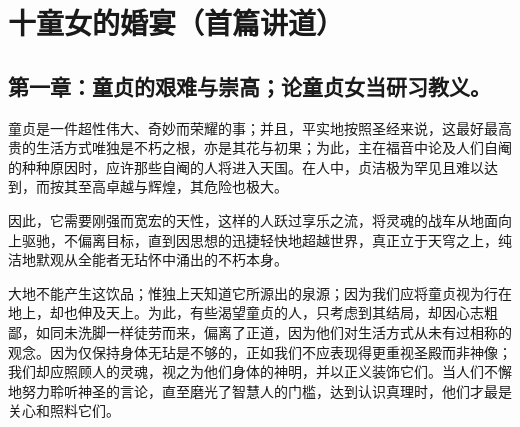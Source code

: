 

\section{十童女的婚宴（首篇讲道）}

\par


\subsection{第一章：童贞的艰难与崇高；论童贞女当研习教义。}

童贞是一件超性伟大、奇妙而荣耀的事；并且，平实地按照圣经来说，这最好最高贵的生活方式唯独是不朽之根，亦是其花与初果；为此，主在福音中论及人们自阉的种种原因时，应许那些自阉的人将进入天国。在人中，贞洁极为罕见且难以达到，而按其至高卓越与辉煌，其危险也极大。\par

因此，它需要刚强而宽宏的天性，这样的人跃过享乐之流，将灵魂的战车从地面向上驱驰，不偏离目标，直到因思想的迅捷轻快地超越世界，真正立于天穹之上，纯洁地默观从全能者无玷怀中涌出的不朽本身。\par

大地不能产生这饮品；惟独上天知道它所源出的泉源；因为我们应将童贞视为行在地上，却也伸及天上。为此，有些渴望童贞的人，只考虑到其结局，却因心志粗鄙，如同未洗脚一样徒劳而来，偏离了正道，因为他们对生活方式从未有过相称的观念。因为仅保持身体无玷是不够的，正如我们不应表现得更重视圣殿而非神像；我们却应照顾人的灵魂，视之为他们身体的神明，并以正义装饰它们。当人们不懈地努力聆听神圣的言论，直至磨光了智慧人的门槛，达到认识真理时，他们才最是关心和照料它们。\par

